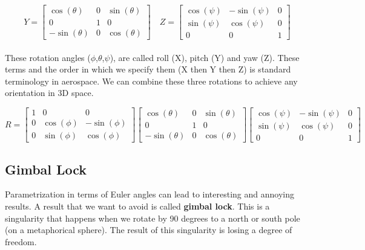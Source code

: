 \documentclass{article}
\begin{document}
\begin{equation*}
    Y = 
    \begin{bmatrix}
    \cos(\theta) & 0 & \sin(\theta) \\
    0 & 1 & 0 \\
    -\sin(\theta) & 0 & \cos(\theta)
    \end{bmatrix}
    \quad
    Z = 
    \begin{bmatrix}
        \cos(\psi) & -\sin(\psi) & 0\\
        \sin(\psi) & \cos(\psi) & 0 \\
        0 & 0 & 1
    \end{bmatrix}
\end{equation*}\\

\noindent These rotation angles ($\phi$,$\theta$,$\psi$), are called roll (X), pitch (Y) and yaw (Z). These terms and the order in 
which we specify them (X then Y then Z) is standard terminology in aerospace. We can combine these three rotations to 
achieve any orientation in 3D space.

\begin{equation*}
    R=    \begin{bmatrix}
        1 & 0 & 0 \\
        0 & \cos(\phi) & -\sin(\phi) \\
        0 & \sin(\phi) & \cos(\phi)
        \end{bmatrix}
        \begin{bmatrix}
            \cos(\theta) & 0 & \sin(\theta) \\
            0 & 1 & 0 \\
            -\sin(\theta) & 0 & \cos(\theta)
        \end{bmatrix}
        \begin{bmatrix}
            \cos(\psi) & -\sin(\psi) & 0\\
            \sin(\psi) & \cos(\psi) & 0 \\
            0 & 0 & 1
        \end{bmatrix}
\end{equation*}

\subsection*{Gimbal Lock}

Parametrization in terms of Euler angles can lead to interesting and annoying results. A result that we want
to avoid is called \textbf{gimbal lock}. This is a singularity that happens when we rotate by 90 degrees to a north
or south pole (on a metaphorical sphere). The result of this singularity is losing a degree of freedom.\\
\end{document}
